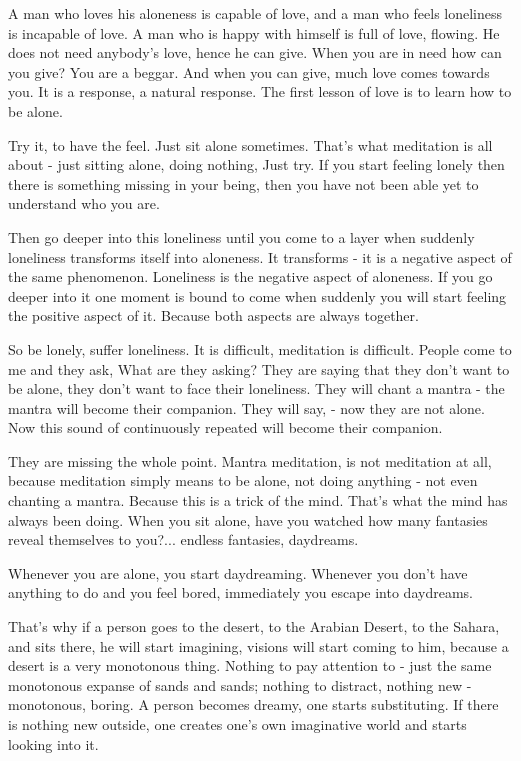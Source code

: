 A man who loves his aloneness is capable of love, and a man who feels loneliness is incapable of love. A man who is happy with himself is full of love, flowing. He does not need anybody's love, hence he can give. When you are in need how can you give? You are a beggar. And when you can give, much love comes towards you. It is a response, a natural response. The first lesson of love is to learn how to be alone.

Try it, to have the feel. Just sit alone sometimes. That's what meditation is all about - just sitting alone, doing nothing, Just try. If you start feeling lonely then there is something missing in your being, then you have not been able yet to understand who you are.

Then go deeper into this loneliness until you come to a layer when suddenly loneliness transforms itself into aloneness. It transforms - it is a negative aspect of the same phenomenon. Loneliness is the negative aspect of aloneness. If you go deeper into it one moment is bound to come when suddenly you will start feeling the positive aspect of it. Because both aspects are always together.

So be lonely, suffer loneliness. It is difficult, meditation is difficult. People come to me and they ask,  What are they asking? They are saying that they don't want to be alone, they don't want to face their loneliness. They will chant a mantra - the mantra will become their companion. They will say,  - now they are not alone. Now this sound of  continuously repeated will become their companion.

They are missing the whole point. Mantra meditation, is not meditation at all, because meditation simply means to be alone, not doing anything - not even chanting a mantra. Because this is a trick of the mind. That's what the mind has always been doing. When you sit alone, have you watched how many fantasies reveal themselves to you?... endless fantasies, daydreams.

Whenever you are alone, you start daydreaming. Whenever you don't have anything to do and you feel bored, immediately you escape into daydreams.

That's why if a person goes to the desert, to the Arabian Desert, to the Sahara, and sits there, he will start imagining, visions will start coming to him, because a desert is a very monotonous thing. Nothing to pay attention to - just the same monotonous expanse of sands and sands; nothing to distract, nothing new - monotonous, boring. A person becomes dreamy, one starts substituting. If there is nothing new outside, one creates one's own imaginative world and starts looking into it.

